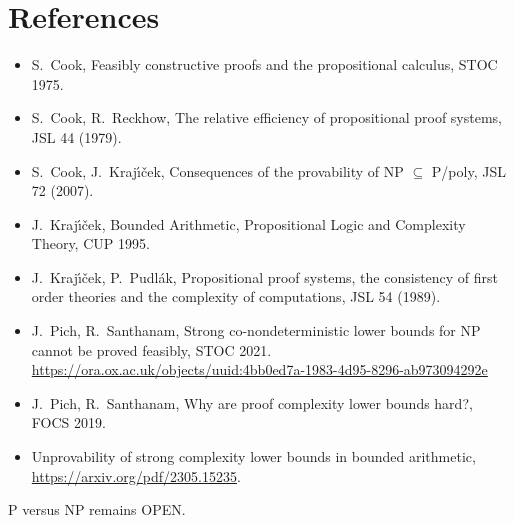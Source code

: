 \documentclass[11pt]{article}
\theoremstyle{definition}
\theoremstyle{remark}
\begin{document}
\section*{References}
\begin{itemize}
\item S.~Cook, Feasibly constructive proofs and the propositional calculus, STOC 1975.
\item S.~Cook, R.~Reckhow, The relative efficiency of propositional proof systems, JSL 44 (1979).
\item S.~Cook, J.~Kraj\'{\i}\v{c}ek, Consequences of the provability of NP $\subseteq$ P/poly, JSL 72 (2007).
\item J.~Kraj\'{\i}\v{c}ek, Bounded Arithmetic, Propositional Logic and Complexity Theory, CUP 1995.
\item J.~Kraj\'{\i}\v{c}ek, P.~Pudl\'ak, Propositional proof systems, the consistency of first order theories and the complexity of computations, JSL 54 (1989).
\item J.~Pich, R.~Santhanam, Strong co-nondeterministic lower bounds for NP cannot be proved feasibly, STOC 2021. \url{https://ora.ox.ac.uk/objects/uuid:4bb0ed7a-1983-4d95-8296-ab973094292e}
\item J.~Pich, R.~Santhanam, Why are proof complexity lower bounds hard?, FOCS 2019.
\item Unprovability of strong complexity lower bounds in bounded arithmetic, \url{https://arxiv.org/pdf/2305.15235}.
\end{itemize}

\noindent P versus NP remains OPEN.
\end{document}
